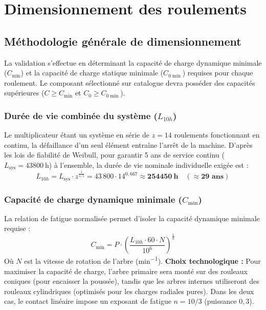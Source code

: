 \documentclass[11pt,a4paper]{article}
\begin{document}
\section{Dimensionnement des roulements}

\subsection{Méthodologie générale de dimensionnement}

La validation s'effectue en déterminant la capacité de charge dynamique minimale ($C_{\min}$) et la capacité de charge statique minimale ($C_{0\min}$) requises pour chaque roulement. Le composant sélectionné sur catalogue devra posséder des capacités supérieures ($C \ge C_{\min}$ et $C_0 \ge C_{0\min}$).

\subsubsection*{Durée de vie combinée du système ($L_{10h}$)}
Le multiplicateur étant un système en série de $z = 14$ roulements fonctionnant en continu, la défaillance d'un seul élément entraîne l'arrêt de la machine. D'après les lois de fiabilité de Weibull, pour garantir 5 ans de service continu ($L_{\text{sys}} = \qty{43800}{\hour}$) à l'ensemble, la durée de vie nominale individuelle exigée est :
\[ L_{10h} = L_{\text{sys}} \cdot z^{\frac{1}{1{,}5}} = 43\,800 \cdot 14^{0{,}667} \approx \mathbf{\qty{254450}{\hour}} \quad (\approx \mathbf{29 \text{ ans}}) \]

\subsubsection*{Capacité de charge dynamique minimale ($C_{\min}$)}
La relation de fatigue normalisée permet d'isoler la capacité dynamique minimale requise :
\[ C_{\min} = P \cdot \left( \frac{L_{10h} \cdot 60 \cdot N}{10^6} \right)^{\frac{1}{n}} \]
Où $N$ est la vitesse de rotation de l'arbre (\unit{\minute^{-1}}). \textbf{Choix technologique :} Pour maximiser la capacité de charge, l'arbre primaire sera monté sur des rouleaux coniques (pour encaisser la poussée), tandis que les arbres internes utiliseront des rouleaux cylindriques (optimisés pour les charges radiales pures). Dans les deux cas, le contact linéaire impose un exposant de fatigue $n = 10/3$ (puissance $0{,}3$).
\end{document}
